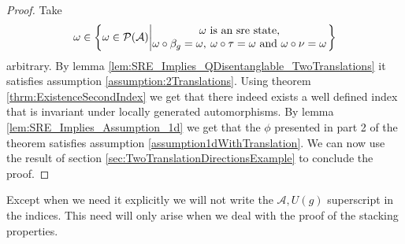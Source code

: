\documentclass[12pt,a4paper,twoside]{article}
\let\originalleft\left
\let\originalright\right
\renewcommand{\left}{\mathopen{}\mathclose\bgroup\originalleft}
\renewcommand{\right}{\aftergroup\egroup\originalright}
\newcommand{\PP}{\mathcal P}
\renewcommand{\AA}{\mathcal A}
\theoremstyle{definition}
\numberwithin{equation}{section}
\begin{document}
\begin{proof}
	Take
	\begin{equation}
		\omega\in\left\{\omega\in\PP(\AA)\left| \begin{matrix}\omega\text{ is an sre state,}\\\omega\circ\beta_g=\omega,\:\omega\circ\tau=\omega\text{ and }\omega\circ\nu=\omega\end{matrix} \right.\right\}
	\end{equation}
	arbitrary. By lemma \ref{lem:SRE_Implies_QDisentanglable_TwoTranslations} it satisfies assumption \ref{assumption:2Translations}. Using theorem \ref{thrm:ExistenceSecondIndex} we get that there indeed exists a well defined index that is invariant under locally generated automorphisms. By lemma \ref{lem:SRE_Implies_Assumption_1d} we get that the $\phi$ presented in part 2 of the theorem satisfies assumption \ref{assumption1dWithTranslation}. We can now use the result of section \ref{sec:TwoTranslationDirectionsExample} to conclude the proof.
\end{proof}
Except when we need it explicitly we will not write the $\AA,U(g)$ superscript in the indices. This need will only arise when we deal with the proof of the stacking properties.
\end{document}
